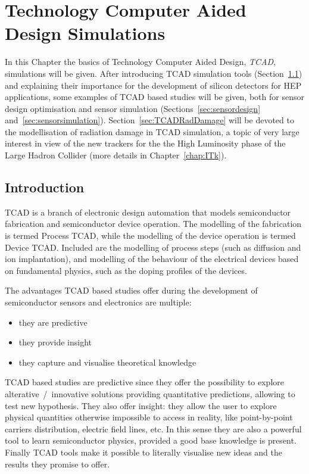 \chapter{Technology Computer Aided Design Simulations}
\label{chap:TCAD}
In this Chapter the basics of Technology Computer Aided Design, {\it TCAD}, simulations will be given. 
After introducing TCAD simulation tools (Section~\ref{sec:TCADIntro}) and explaining their importance
 for the development of silicon detectors for HEP applications, some examples of TCAD based 
 studies will be given, both for sensor design optimisation and sensor simulation 
 (Sections~\ref{sec:sensordesign} and~\ref{sec:sensorsimulation}). 
Section~\ref{sec:TCADRadDamage} will be devoted to the modellisation of radiation damage in 
TCAD simulation, a topic of very large interest in view of the new trackers for the 
the High Luminosity phase of the Large Hadron Collider (more details in Chapter~\ref{chap:ITk}).

\section{Introduction}
\label{sec:TCADIntro}

 TCAD is a branch of electronic design automation that models semiconductor fabrication and 
 semiconductor device operation. 
 The modelling of the fabrication is termed Process TCAD, while the modelling of the device operation 
 is termed Device TCAD. 
Included are the modelling of process steps (such as diffusion and ion implantation), and modelling of 
the behaviour of the electrical devices based on fundamental physics, such as the doping profiles of 
the devices. 

The advantages TCAD based studies offer during the development of semiconductor sensors 
and electronics are multiple: 

\begin{itemize}
\item they are predictive
\item they provide insight
\item they capture and visualise theoretical knowledge
\end{itemize}

TCAD based studies are predictive since they offer the possibility to explore alterative~/~innovative 
solutions providing quantitative predictions, allowing to test new hypothesis. 
They also offer insight: they allow the user to explore physical quantities otherwise impossible to 
access in reality, like point-by-point carriers distribution, electric field lines, etc. In this sense they 
are also a powerful tool to learn semiconductor physics, provided a good base knowledge is present.
Finally TCAD tools make it possible to literally visualise new ideas and the results they promise to 
offer.

